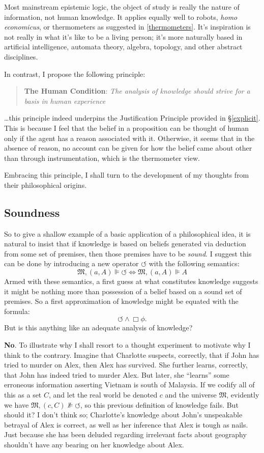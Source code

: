 \documentclass[11pt]{article}
\numberwithin{equation}{subsection}
\renewcommand{\Omega}{\mathfrak{M}}
\begin{document}
Most mainstream epistemic logic, the object of study is really the
nature of information, not human knowledge.  It applies equally well
to robots, \emph{homo economicus}, or thermometers as suggested in
\ref{thermometers}.  It's inspiration is not really in what it's like
to be a living person; it's more naturally based in artificial intelligence, automata
theory, algebra, topology, and other abstract disciplines.

In contrast, I propose the following principle:
\begin{quote}
 \textbf{The Human Condition}: \emph{The analysis of knowledge should strive for a basis in human experience}
\end{quote}
\ldots this principle indeed underpins the Justification Principle
provided in \S\ref{explicit}. This is because I feel that the belief
in a proposition can be thought of human only if the agent has a
reason associated with it.  Otherwise, it seems that in the absence of
reason, no account can be given for how the belief came about other
than through instrumentation, which is the thermometer view.

Embracing this principle, I shall turn to the development of my
thoughts from their philosophical origins.

\subsection{Soundness}\label{soundness}
So to give a shallow example of a basic application of a philosophical
idea, it is natural to insist that if knowledge is based on beliefs
generated via deduction from some set of premises, then those premises
have to be \emph{sound}. I suggest this can be done by introducing a
new operator $\circlearrowleft$ with the following semantics:
\[ \Omega,(a,A)\VDash \circlearrowleft \iff \Omega,(a,A)\VDash A\]
Armed with these semantics, a first guess at what constitutes
knowledge suggests it might be nothing more than possession of a
belief based on a sound set of premises. So a first approximation of
knowledge might be equated with the formula:
$$\circlearrowleft \wedge \Box \phi.$$
But is this anything like an adequate analysis of knowledge?

\textbf{No}. To illustrate why I shall resort to a thought experiment to motivate why I think to the contrary.
Imagine that Charlotte suspects, correctly, that if John has tried to murder
on Alex, then Alex has survived.  She further learns, correctly, that John
has indeed tried to murder Alex.  But later, she ``learns'' some erroneous
information asserting Vietnam is south of Malaysia.  If we codify all of this as
a set $C$, and let the real world be
denoted $c$ and the universe $\Omega$, evidently we have $\Omega, (c, C) \nVDash
\circlearrowleft$, so this previous definition of knowledge fails.  But
should it?  I don't think so; Charlotte's knowledge about John's unspeakable
betrayal of Alex is correct, as well as her inference that Alex is tough as
nails.  Just because she has been deluded regarding irrelevant facts
about geography shouldn't have any bearing on her
knowledge about Alex.
\end{document}
